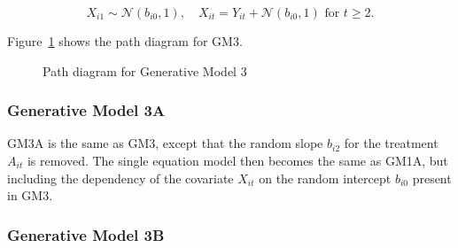\documentclass[
  12pt,
  a4paper,
]{article}
\begin{document}
\[
X_{i1} \sim \mathcal{N}(b_{i0}, 1), \quad X_{it} = Y_{it} + \mathcal{N}(b_{i0}, 1) \text{ for } t \geq 2.
\]

Figure~\ref{fig-GM3_path} shows the path diagram for GM3.

\begin{figure}[H]

\caption{\label{fig-GM3_path}Path diagram for Generative Model 3}


\end{figure}%

\subsubsection{Generative Model 3A}\label{generative-model-3a}

GM3A is the same as GM3, except that the random slope \(b_{i2}\) for the
treatment \(A_{it}\) is removed. The single equation model then becomes
the same as GM1A, but including the dependency of the covariate
\(X_{it}\) on the random intercept \(b_{i0}\) present in GM3.

\subsubsection{Generative Model 3B}\label{generative-model-3b}
\end{document}
